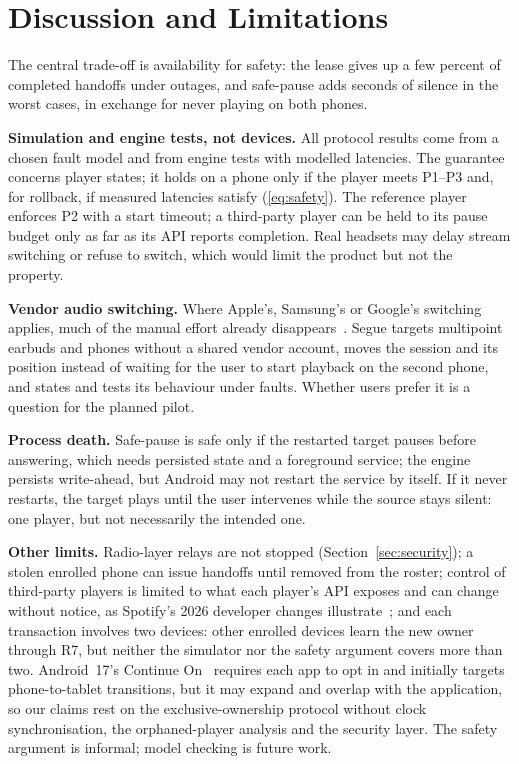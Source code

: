 \documentclass[conference]{IEEEtran}
\begin{document}
\section{Discussion and Limitations}

The central trade-off is availability for safety: the lease gives up a few percent of completed handoffs under outages, and safe-pause adds seconds of silence in the worst cases, in exchange for never playing on both phones.

\textbf{Simulation and engine tests, not devices.} All protocol results come from a chosen fault model and from engine tests with modelled latencies. The guarantee concerns player states; it holds on a phone only if the player meets P1--P3 and, for rollback, if measured latencies satisfy (\ref{eq:safety}). The reference player enforces P2 with a start timeout; a third-party player can be held to its pause budget only as far as its API reports completion. Real headsets may delay stream switching or refuse to switch, which would limit the product but not the property.

\textbf{Vendor audio switching.} Where Apple's, Samsung's or Google's switching applies, much of the manual effort already disappears~\cite{applesw,samsungsw,googlesw}. Segue targets multipoint earbuds and phones without a shared vendor account, moves the session and its position instead of waiting for the user to start playback on the second phone, and states and tests its behaviour under faults. Whether users prefer it is a question for the planned pilot.

\textbf{Process death.} Safe-pause is safe only if the restarted target pauses before answering, which needs persisted state and a foreground service; the engine persists write-ahead, but Android may not restart the service by itself. If it never restarts, the target plays until the user intervenes while the source stays silent: one player, but not necessarily the intended one.

\textbf{Other limits.} Radio-layer relays are not stopped (Section~\ref{sec:security}); a stolen enrolled phone can issue handoffs until removed from the roster; control of third-party players is limited to what each player's API exposes and can change without notice, as Spotify's 2026 developer changes illustrate~\cite{spotify2026}; and each transaction involves two devices: other enrolled devices learn the new owner through R7, but neither the simulator nor the safety argument covers more than two. Android~17's Continue On~\cite{android17,continueon} requires each app to opt in and initially targets phone-to-tablet transitions, but it may expand and overlap with the application, so our claims rest on the exclusive-ownership protocol without clock synchronisation, the orphaned-player analysis and the security layer. The safety argument is informal; model checking is future work.
\end{document}
